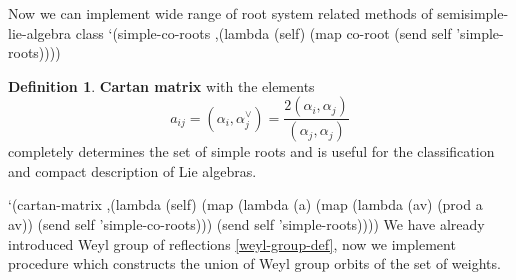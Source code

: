 \documentclass[a4paper,10pt]{article}%
\theoremstyle{definition} \newtheorem{Def}{Definition}
\begin{document}
Now we can implement wide range of root system related methods of {\Tt{}semisimple-lie-algebra\nwendquote} class
\nwenddocs{}\endmoddef\nwstartdeflinemarkup{}\nwenddeflinemarkup
`(simple-co-roots ,(lambda (self)
              (map co-root (send self 'simple-roots))))
\nwendcode{}\nwdocspar
\begin{Def}
  {\bf Cartan matrix} with the elements
  \begin{equation}
    \label{eq:7}
    a_{ij}=(\alpha_i,\alpha_j^{\vee})=\frac{2(\alpha_i,\alpha_j)}{(\alpha_j,\alpha_j)}
  \end{equation}
  completely determines the set of simple roots and is useful for the classification and compact description of Lie algebras.
\end{Def}
\nwenddocs{}\plusendmoddef\nwstartdeflinemarkup{}\nwenddeflinemarkup
`(cartan-matrix
  ,(lambda (self)
     (map (lambda (a)
            (map (lambda (av) (prod a av)) (send self 'simple-co-roots)))
         (send self 'simple-roots))))
\nwendcode{}\nwdocspar
We have already introduced Weyl group of reflections \ref{weyl-group-def}, now we implement procedure which constructs the union of Weyl group orbits of the set of weights.
\nwenddocs{}\plusendmoddef\nwstartdeflinemarkup{}\nwenddeflinemarkup
\end{document}
